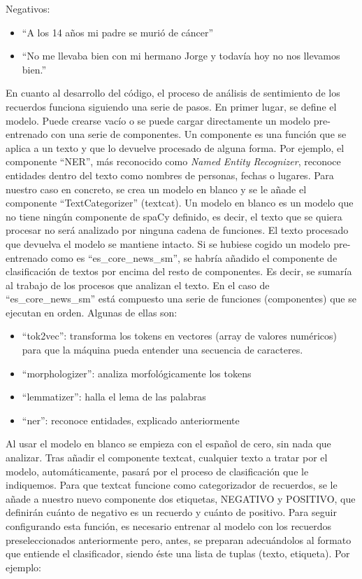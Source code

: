 Negativos:
\begin{itemize}
	\item ``A los 14 años mi padre se murió de cáncer''
	\item ``No me llevaba bien con mi hermano Jorge y todavía hoy no nos llevamos bien.''
\end{itemize}

En cuanto al desarrollo del código, el proceso de análisis de sentimiento de los recuerdos funciona siguiendo una serie de pasos. En primer lugar, se define el modelo. Puede crearse vacío o se puede cargar directamente un modelo pre-entrenado con una serie de componentes. Un componente es una función que se aplica a un texto y que lo devuelve procesado de alguna forma. Por ejemplo, el componente ``NER'', más reconocido como \textit{Named Entity Recognizer}, reconoce entidades dentro del texto como nombres de personas, fechas o lugares. Para nuestro caso en concreto, se crea un modelo en blanco y se le añade el componente ``TextCategorizer'' (textcat). Un modelo en blanco es un modelo que no tiene ningún componente de spaCy definido, es decir, el texto que se quiera procesar no será analizado por ninguna cadena de funciones. El texto procesado que devuelva el modelo se mantiene intacto. Si se hubiese cogido un modelo pre-entrenado como es ``es\_core\_news\_sm'', se habría añadido el componente de clasificación de textos por encima del resto de componentes. Es decir, se sumaría al trabajo de los procesos que analizan el texto. En el caso de ``es\_core\_news\_sm'' está compuesto una serie de funciones (componentes) que se ejecutan en orden. Algunas de ellas son:
\begin{itemize}
	\item ``tok2vec'': transforma los tokens en vectores (array de valores numéricos) para que la máquina pueda entender una secuencia de caracteres.
	\item ``morphologizer'': analiza morfológicamente los tokens
	\item ``lemmatizer'': halla el lema de las palabras
	\item ``ner'': reconoce entidades, explicado anteriormente
\end{itemize}
Al usar el modelo en blanco se empieza con el español de cero, sin nada que analizar. Tras añadir el componente textcat, cualquier texto a tratar por el modelo, automáticamente, pasará por el proceso de clasificación que le indiquemos. Para que textcat funcione como categorizador de recuerdos, se le añade a nuestro nuevo componente dos etiquetas, NEGATIVO y POSITIVO, que definirán cuánto de negativo es un recuerdo y cuánto de positivo. Para seguir configurando esta función, es necesario entrenar al modelo con los recuerdos preseleccionados anteriormente pero, antes, se preparan adecuándolos al formato que entiende el clasificador, siendo éste una lista de tuplas (texto, etiqueta). Por ejemplo: \\

